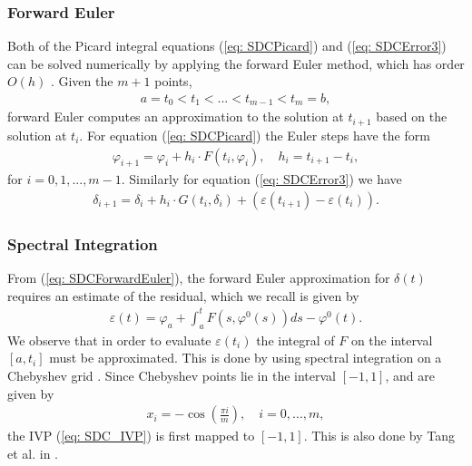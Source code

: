 \documentclass{sfuthesis}
\begin{document}
\subsubsection{Forward Euler}
Both of the Picard integral equations (\ref{eq: SDCPicard}) and (\ref{eq: SDCError3}) can be solved numerically by applying the forward Euler method, which has order $O(h)$ \cite{Lev2007}.  
Given the $m+1$ points, 
\begin{align*}
	a=t_0 < t_1< ... < t_{m-1} < t_m=b, 
\end{align*}
forward Euler computes an approximation to the solution at $t_{i+1}$ based on the solution at $t_i$. 
For equation (\ref{eq: SDCPicard}) the Euler steps have the form 
\begin{align*}
	\varphi_{i+1}=\varphi_{i}+h_i\cdot F(t_i, \varphi_i), \quad h_i=t_{i+1}-t_i,
\end{align*}
for $i=0,1,..., m-1$. 
Similarly for equation (\ref{eq: SDCError3}) we have
\begin{align}
	\delta_{i+1}=\delta_i +h_i \cdot G(t_i, \delta_i) + (\varepsilon(t_{i+1})-\varepsilon(t_i)). \label{eq: SDCForwardEuler}
\end{align}

\subsubsection{Spectral Integration}
From (\ref{eq: SDCForwardEuler}), the forward Euler approximation for $\delta(t)$ requires an estimate of the residual, which we recall is given by 
\begin{align*}
	\varepsilon(t)=\varphi_a +\int_a^t F(s, \varphi^0(s))ds -\varphi^0(t). 
\end{align*}
We observe that in order to evaluate $\varepsilon(t_i)$ the integral of $F$ on the interval $[a, t_i]$ must be approximated. This is done by using spectral integration on a Chebyshev grid \cite{Dutt2000}. Since Chebyshev points lie in the interval $[-1,1]$, and are given by 
\begin{align*}
	x_i=-\cos \left(\frac{\pi i}{m}\right), \quad i=0,...,m, 
\end{align*}
the IVP (\ref{eq: SDC_IVP}) is first mapped to $[-1,1]$. This is also done by Tang et al. in \cite{Tang2008}. 
\end{document}
